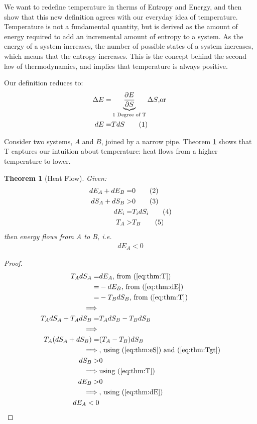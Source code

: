 \documentclass[]{article}
\newcommand\numberthis{\addtocounter{equation}{1}\tag{\theequation}}
\newtheorem{thm}{Theorem}
\begin{document}
 We want to redefine temperature in therms of Entropy and Energy, and then show that this new definition agrees with our everyday idea of temperature. Temperature is not a fundamental quantity, but is derived as the amount of energy required to add an incremental amount of entropy to a system.  As the energy of a system increases, the number of possible states of a system increases, which means that the entropy increases.  This is the concept behind the second law of thermodynamics, and implies that temperature is always positive.
 
 Our definition reduces to:
\begin{align*}
\Delta E =& \underbrace{\frac{\partial E}{\partial S}}_\text{1 Degree of T} \Delta S\text{,or }\\
dE =& T dS \numberthis \label{eq:T}
\end{align*}

Consider two systems, $A$ and $B$, joined by a narrow pipe. Theorem \ref{thm:heat:flow} shows that T captures our intuition about temperature: heat flows from a higher temperature to lower.

\begin{thm}[Heat Flow]\label{thm:heat:flow}
	Given:
	\begin{align*}
	dE_A + dE_B =& 0 \numberthis \label{eq:thm:dE}\\
	dS_A + dS_B>& 0 \numberthis \label{eq:thm:eS} \\
	dE_i =& T_i dS_i \numberthis \label{eq:thm:T} \\
	T_A>&T_B \numberthis \label{eq:thm:Tgt}
	\end{align*}
	then energy flows from A to B, i.e.
	\begin{align*}
	dE_A<0
	\end{align*}
\end{thm}
\begin{proof}
	\begin{align*}
	T_A dS_A =& dE_A \text{, from (\ref{eq:thm:T})}\\
	=& - dE_B \text{, from (\ref{eq:thm:dE})}\\
	=& - T_B dS_B  \text{, from (\ref{eq:thm:T})}\\
	\implies&\\
	T_A dS_A + T_A dS_B =& T_A dS_B -T_B dS_B\\
	\implies&\\
	T_A (dS_A + dS_B) =& (T_A  -T_B) dS_B\\
	\implies& \text{, using (\ref{eq:thm:eS}) and (\ref{eq:thm:Tgt})}\\
	dS_B >& 0\\
	\implies& \text{using (\ref{eq:thm:T})}\\
	dE_B >& 0\\
	\implies& \text{, using (\ref{eq:thm:dE})}\\
	dE_A<0
	\end{align*}
\end{proof}
\end{document}
